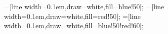 =[line width=0.1em,draw=white,fill=blue!50];
=[line width=0.1em,draw=white,fill=red!50];
=[line width=0.1em,draw=white,fill=blue!50!red!60];
